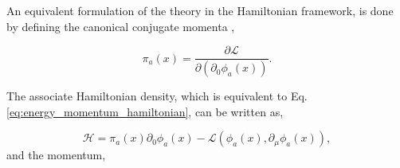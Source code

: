 \documentclass[11pt,a4paper,twoside,pdf]{article}
\numberwithin{equation}{section}
\begin{document}

An equivalent formulation of the theory in the Hamiltonian framework, is done by
defining the canonical conjugate momenta \cite{Peskin:1995ev},

\begin{equation}
    \pi_a (x) = \frac{\partial \mathcal{L}}{\partial (\partial_0 \phi_a (x))}.
\end{equation}

The associate Hamiltonian density, which is equivalent to Eq.\eqref{eq:energy_momentum_hamiltonian},
can be written as,

\begin{equation}
    \mathcal{H} = \pi_a (x) \partial_0 \phi_a (x) - \mathcal{L}(\phi_a (x),\partial_\mu\phi_a (x)),
\end{equation}
and the momentum, 
\end{document}

